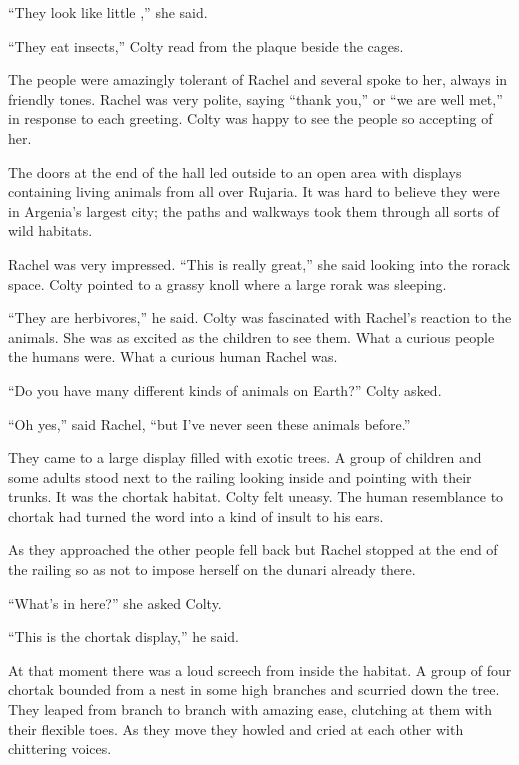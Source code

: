 ``They look like little ,'' she said.

``They eat insects,'' Colty read from the plaque beside the cages.

The people were amazingly tolerant of Rachel and several spoke to her, always in friendly tones.
Rachel was very polite, saying ``thank you,'' or ``we are well met,'' in response to each
greeting. Colty was happy to see the people so accepting of her.


The doors at the end of the hall led outside to an open area with displays containing living
animals from all over Rujaria. It was hard to believe they were in Argenia's largest city; the
paths and walkways took them through all sorts of wild habitats.

Rachel was very impressed. ``This is really great,'' she said looking into the rorack space.
Colty pointed to a grassy knoll where a large rorak was sleeping.

``They are herbivores,'' he said. Colty was fascinated with Rachel's reaction to the animals.
She was as excited as the children to see them. What a curious people the humans were. What a
curious human Rachel was.

``Do you have many different kinds of animals on Earth?'' Colty asked.

``Oh yes,'' said Rachel, ``but I've never seen these animals before.''

They came to a large display filled with exotic trees. A group of children and some adults stood
next to the railing looking inside and pointing with their trunks. It was the chortak habitat.
Colty felt uneasy. The human resemblance to chortak had turned the word into a kind of insult to
his ears.

As they approached the other people fell back but Rachel stopped at the end of the railing so as
not to impose herself on the dunari already there.

``What's in here?'' she asked Colty.

``This is the chortak display,'' he said.

At that moment there was a loud screech from inside the habitat. A group of four chortak
bounded from a nest in some high branches and scurried down the tree. They leaped from branch to
branch with amazing ease, clutching at them with their flexible toes. As they move they howled
and cried at each other with chittering voices.

